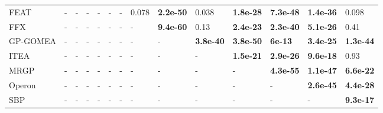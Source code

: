 \begin{table}
\begin{tabular}{llllllllllllll}
FEAT      &                - &                - &                - &                - &                - &                - &            0.078 &  \textbf{2.2e-50} &            0.038 &  \textbf{1.8e-28} &  \textbf{7.3e-48} &  \textbf{1.4e-36} &            0.098 \\
FFX       &                - &                - &                - &                - &                - &                - &                - &  \textbf{9.4e-60} &             0.13 &  \textbf{2.4e-23} &  \textbf{2.3e-40} &  \textbf{5.1e-26} &             0.41 \\
GP-GOMEA  &                - &                - &                - &                - &                - &                - &                - &                - &  \textbf{3.8e-40} &  \textbf{3.8e-50} &    \textbf{6e-13} &  \textbf{3.4e-25} &  \textbf{1.3e-44} \\
ITEA      &                - &                - &                - &                - &                - &                - &                - &                - &                - &  \textbf{1.5e-21} &  \textbf{2.9e-26} &  \textbf{9.6e-18} &             0.93 \\
MRGP      &                - &                - &                - &                - &                - &                - &                - &                - &                - &                - &  \textbf{4.3e-55} &  \textbf{1.1e-47} &  \textbf{6.6e-22} \\
Operon    &                - &                - &                - &                - &                - &                - &                - &                - &                - &                - &                - &  \textbf{2.6e-45} &  \textbf{4.4e-28} \\
SBP       &                - &                - &                - &                - &                - &                - &                - &                - &                - &                - &                - &                - &  \textbf{9.3e-17} \\
\bottomrule
\end{tabular}
\end{table}

